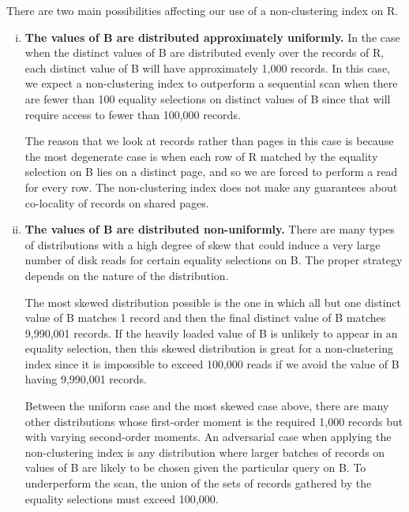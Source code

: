 \documentclass[letterpaper]{article}%
\begin{document}
\begin{enumerate}[1.]
    There are two main possibilities affecting our use of a non-clustering
    index on R.

    \begin{enumerate}[i)]
      \item \textbf{The values of B are distributed approximately uniformly.}
        In the case when the distinct values of B are distributed evenly over
        the records of R, each distinct value of B will have approximately
        1,000 records. In this case, we expect a non-clustering index to
        outperform a sequential scan when there are fewer than 100 equality
        selections on distinct values of B since that will require access to
        fewer than 100,000 records.
        
        The reason that we look at records rather than pages in this case is
        because the most degenerate case is when each row of R matched by the
        equality selection on B lies on a distinct page, and so we are forced
        to perform a read for every row. The non-clustering index does not make
        any guarantees about co-locality of records on shared pages.

      \item \textbf{The values of B are distributed non-uniformly.} There are
        many types of distributions with a high degree of skew that could
        induce a very large number of disk reads for certain equality
        selections on B. The proper strategy depends on the nature of the
        distribution.
        
        The most skewed distribution possible is the one in which all but one
        distinct value of B matches 1 record and then the final distinct value
        of B matches 9,990,001 records. If the heavily loaded value of B is
        unlikely to appear in an equality selection, then this skewed
        distribution is great for a non-clustering index since it is impossible
        to exceed 100,000 reads if we avoid the value of B having 9,990,001
        records.

        Between the uniform case and the most skewed case above, there are many
        other distributions whose first-order moment is the required 1,000
        records but with varying second-order moments. An adversarial case when
        applying the non-clustering index is any distribution where larger
        batches of records on values of B are likely to be chosen given the
        particular query on B. To underperform the scan, the union of the sets
        of records gathered by the equality selections must exceed 100,000.
    \end{enumerate}


\end{enumerate}
\end{document}
